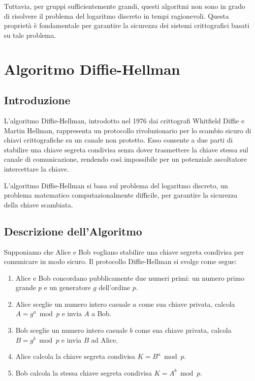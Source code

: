 \documentclass[a4paper,12pt]{report}
\begin{document}
Tuttavia, per gruppi sufficientemente grandi, questi algoritmi non sono in grado di risolvere il problema del logaritmo discreto in tempi ragionevoli. Questa proprietà è fondamentale per garantire la sicurezza dei sistemi crittografici basati su tale problema.
%
%
%
%
%
%
%
%
%
%
%
%
%
%
\chapter{Algoritmo Diffie-Hellman}

\section{Introduzione}
L'algoritmo Diffie-Hellman, introdotto nel 1976 dai crittografi Whitfield Diffie e Martin Hellman, rappresenta un protocollo rivoluzionario per lo scambio sicuro di chiavi crittografiche su un canale non protetto. Esso consente a due parti di stabilire una chiave segreta condivisa senza dover trasmettere la chiave stessa sul canale di comunicazione, rendendo così impossibile per un potenziale ascoltatore intercettare la chiave.

L'algoritmo Diffie-Hellman si basa sul problema del logaritmo discreto, un problema matematico computazionalmente difficile, per garantire la sicurezza della chiave scambiata.

\section{Descrizione dell'Algoritmo}

Supponiamo che Alice e Bob vogliano stabilire una chiave segreta condivisa per comunicare in modo sicuro. Il protocollo Diffie-Hellman si svolge come segue:

\begin{enumerate}
    \item Alice e Bob concordano pubblicamente due numeri primi: un numero primo grande $p$ e un generatore $g$ dell'ordine $p$.
    \item Alice sceglie un numero intero casuale $a$ come sua chiave privata, calcola $A = g^a \bmod p$ e invia $A$ a Bob.
    \item Bob sceglie un numero intero casuale $b$ come sua chiave privata, calcola $B = g^b \bmod p$ e invia $B$ ad Alice.
    \item Alice calcola la chiave segreta condivisa $K = B^a \bmod p$.
    \item Bob calcola la stessa chiave segreta condivisa $K = A^b \bmod p$.
\end{enumerate}
\end{document}
